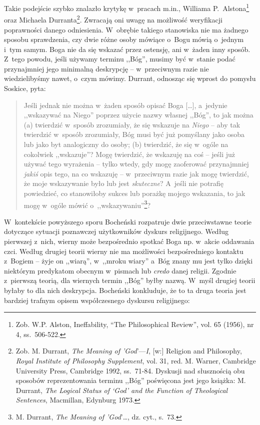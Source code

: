 Takie podejście szybko znalazło krytykę w~pracach m.in., Williama P.~Alstona\footnote{Zob. W.P. Alston, Ineffability, ``The Philosophical Review'', vol. 65 (1956), nr 4, ss.~506-522.} oraz Michaela Durranta\footnote{Zob. M. Durrant, \textit{The Meaning of 'God}'—\textit{I}, [w:] Religion and Philosophy, \textit{Royal Institute of Philosophy Supplement}, vol. 31, red. M. Warner, Cambridge University Press, Cambridge 1992, ss.~71-84. Dyskusji nad słusznością obu sposobów reprezentowania terminu ,,Bóg'' poświęcona jest jego książka: M. Durrant, \textit{The Logical Status of ‘God' and the Function of Theological Sentences}, Macmillan, Edynburg 1973.}. Zwracają oni uwagę na możliwość weryfikacji poprawności danego odniesienia. W~obrębie takiego stanowiska nie ma żadnego sposobu sprawdzenia, czy dwie różne osoby mówiące o~Bogu mówią o~jednym i~tym samym. Boga nie da się wskazać przez ostensję, ani w~żaden inny sposób. Z~tego powodu, jeśli używamy terminu ,,Bóg'', musimy być w~stanie podać przynajmniej jego minimalną deskrypcję -- w~przeciwnym razie nie wiedzielibyśmy nawet, o~czym mówimy. Durrant, odnosząc się wprost do pomysłu Soskice, pyta:

\begin{quote}
Jeśli jednak nie można w~żaden sposób opisać Boga [\ldots], a~jedynie ,,wskazywać na Niego'' poprzez użycie nazwy własnej ,,Bóg'', to jak można (a) twierdzić w~sposób zrozumiały, że się wskazuje na \textit{Niego} -- aby tak twierdzić w~sposób zrozumiały, Bóg musi być już pomyślany jako osoba lub jako byt analogiczny do osoby; (b) twierdzić, że się w~ogóle na cokolwiek ,,wskazuje''? Mogę twierdzić, że wskazuję na coś -- jeśli już używać tego wyrażenia -- tylko wtedy, gdy mogę zaoferować przynajmniej \textit{jakiś} opis tego, na co wskazuję -- w~przeciwnym razie jak mogę twierdzić, że moje wskazywanie było lub jest \textit{skuteczne}? A~jeśli nie potrafię powiedzieć, co stanowiłoby sukces lub porażkę mojego wskazania, to jak mogę w~ogóle mówić o~,,wskazywaniu''\footnote{M. Durrant, \textit{The Meaning of 'God}'\ldots, dz. cyt., s.~73.}?
\end{quote}

W~kontekście powyższego sporu Bocheński rozpatruje dwie przeciwstawne teorie dotyczące sytuacji poznawczej użytkowników dyskurs religijnego. Według pierwszej z~nich, wierny może bezpośrednio spotkać Boga np. w~akcie oddawania czci. Według drugiej teorii wierny nie ma możliwości bezpośredniego kontaktu z~Bogiem -- żyje on ,,wiarą'', w~,,mroku wiary'' a~Bóg znany mu jest tylko dzięki niektórym predykatom obecnym w~pismach lub \textit{credo} danej religii. Zgodnie z~pierwszą teorią, dla wiernych termin ,,Bóg'' byłby nazwą. W~myśl drugiej teorii byłaby to dla nich deskrypcja. Bocheński konkluduje, że to ta druga teoria jest bardziej trafnym opisem współczesnego dyskursu religijnego:


